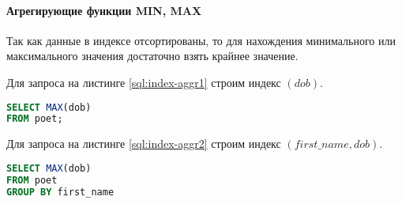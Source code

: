 \paragraph{Агрегирующие функции MIN, MAX}

Так как данные в индексе отсортированы, то для нахождения минимального или максимального значения достаточно взять крайнее значение.

Для запроса на листинге \ref{sql:index-aggr1} строим индекс $(dob)$.
\begin{lstlisting}[language=sql, label=sql:index-aggr1, caption={запрос для index-aggr}]
SELECT MAX(dob) 
FROM poet;
\end{lstlisting}

Для запроса на листинге \ref{sql:index-aggr2} строим индекс $(first\_name, dob)$.
\begin{lstlisting}[language=sql, label=sql:index-aggr2, caption={запрос для index-aggr}]
SELECT MAX(dob) 
FROM poet
GROUP BY first_name
\end{lstlisting}

